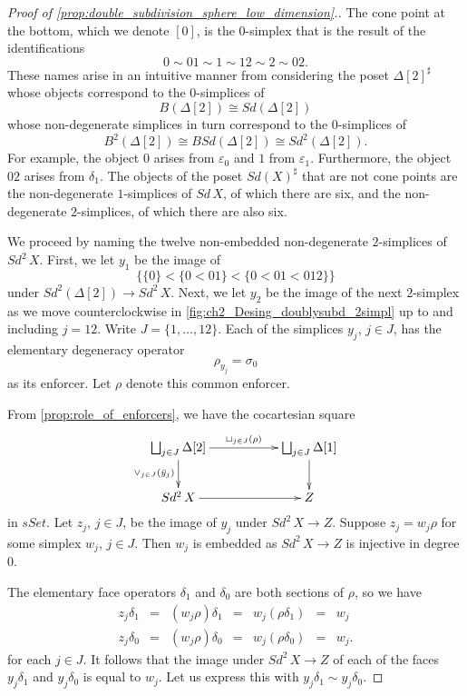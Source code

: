 \begin{proof}[Proof of \cref{prop:double_subdivision_sphere_low_dimension}.]
The cone point at the bottom, which we denote $[0]$, is the $0$-simplex that is the result of the identifications
\[0\sim 01\sim 1\sim 12\sim 2\sim 02.\]
These names arise in an intuitive manner from considering the poset $\Delta [2]^\sharp$ whose objects correspond to the $0$-simplices of
\[B(\Delta [2])\cong Sd(\Delta [2])\]
whose non-degenerate simplices in turn correspond to the $0$-simplices of
\[B^2(\Delta [2])\cong BSd(\Delta [2])\cong Sd^2(\Delta [2]).\]
For example, the object $0$ arises from $\varepsilon _0$ and $1$ from $\varepsilon _1$. Furthermore, the object $02$ arises from $\delta _1$. The objects of the poset $Sd(X)^\sharp$ that are not cone points are the non-degenerate $1$-simplices of $Sd\, X$, of which there are six, and the non-degenerate $2$-simplices, of which there are also six.

We proceed by naming the twelve non-embedded non-degenerate $2$-simplices of $Sd^2\, X$. First, we let $y_1$ be the image of
\[\{ \{0\} <\{0<01\} <\{0<01<012\} \}\]
under $Sd^2(\Delta [2])\to Sd^2\, X$. Next, we let $y_2$ be the image of the next $2$-simplex as we move counterclockwise in \cref{fig:ch2_Desing_doublysubd_2simpl} up to and including $j=12$. Write $J=\{ 1,\dots ,12\}$. Each of the simplices $y_j$, $j\in J$, has the elementary degeneracy operator
\[\rho _{y_j}=\sigma _0\]
as its enforcer. Let $\rho$ denote this common enforcer.

From \cref{prop:role_of_enforcers}, we have the cocartesian square
\begin{equation}
\label{eq:second_diagram_proof_prop_double_subdivision_sphere_low_dimension}
\begin{gathered}
\xymatrix{
\bigsqcup _{j\in J}\Delta [2] \ar[d]_{\vee _{j\in J}(\bar{y} _j)} \ar[rr]^{\sqcup _{j\in J}(\rho )} && \bigsqcup _{j\in J}\Delta [1] \ar[d] \\
Sd^2\, X \ar[rr] && Z
}
\end{gathered}
\end{equation}
in $sSet$. Let $z_j$, $j\in J$, be the image of $y_j$ under $Sd^2\, X\to Z$. Suppose $z_j=w_j\rho$ for some simplex $w_j$, $j\in J$. Then $w_j$ is embedded as $Sd^2\, X\to Z$ is injective in degree $0$.

The elementary face operators $\delta _1$ and $\delta _0$ are both sections of $\rho$, so we have
\begin{displaymath}
\begin{array}{rclclcl}
z_j\delta _1 & = & (w_j\rho )\delta _1 & = & w_j(\rho \delta _1) & = & w_j \\
z_j\delta _0 & = & (w_j\rho )\delta _0 & = & w_j(\rho \delta _0) & = & w_j.
\end{array}
\end{displaymath}
for each $j\in J$. It follows that the image under $Sd^2\, X\to Z$ of each of the faces $y_j\delta _1$ and $y_j\delta _0$ is equal to $w_j$. Let us express this with $y_j\delta _1\sim y_j\delta _0$.


\end{proof}
